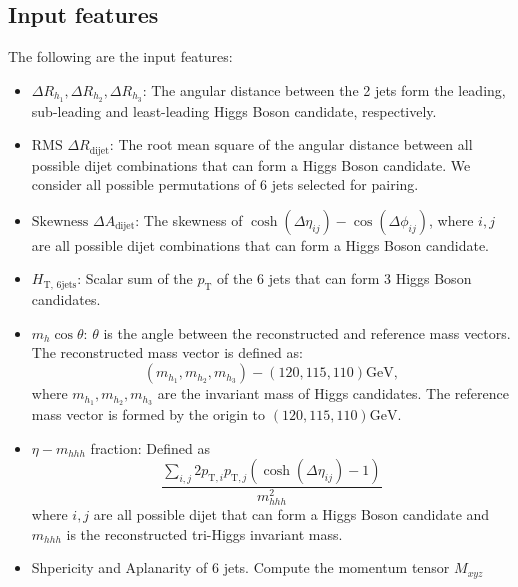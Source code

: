 \documentclass[12pt]{article}
\begin{document}
    \subsection{Input features}%
    \label{sub:input_features}
        The following are the input features:
        \begin{itemize}
            \item $\Delta R_{h_1}, \Delta R_{h_2}, \Delta R_{h_3}$: The angular distance between the 2 jets form the leading, sub-leading and least-leading Higgs Boson candidate, respectively.
            \item $\text{RMS } \Delta R_{\text{dijet}}$: The root mean square of the angular distance between all possible dijet combinations that can form a Higgs Boson candidate. We consider all possible permutations of 6 jets selected for pairing.
            \item $\text{Skewness } \Delta A_{\text{dijet}}$: The skewness of $\cosh\left( \Delta\eta_{ij} \right) - \cos\left( \Delta\phi_{ij} \right) $, where $i,j$ are all possible dijet combinations that can form a Higgs Boson candidate.
            \item $H_{\text{T, 6jets}}$: Scalar sum of the $p_{\text{T}}$ of the 6 jets that can form 3 Higgs Boson candidates.
            \item $m_{h}\cos\theta$: $\theta$ is the angle between the reconstructed and reference mass vectors. The reconstructed mass vector is defined as:
                \begin{equation}
                    \left( m_{h_1}, m_{h_2}, m_{h_3} \right) - \left( 120, 115, 110 \right) \text{GeV},
                \end{equation}
                where $m_{h_1}, m_{h_2}, m_{h_3}$ are the invariant mass of Higgs candidates. The reference mass vector is formed by the origin to $\left( 120, 115, 110 \right) \text{GeV}$.
            \item $\eta - m_{hhh}$ fraction: Defined as
            \begin{equation}
            \frac{\sum_{i,j} 2 p_{\text{T},i} p_{\text{T},j} \left( \cosh\left( \Delta\eta_{ij} \right) -1 \right) }{m_{hhh}^2}
            \end{equation}
            where $i,j$ are all possible dijet that can form a Higgs Boson candidate and $m_{hhh}$ is the reconstructed tri-Higgs invariant mass.
            \item Shpericity and Aplanarity of 6 jets. Compute the momentum tensor $M_{xyz}$
               \begin{equation}

\end{equation}
\end{itemize}
\end{document}
